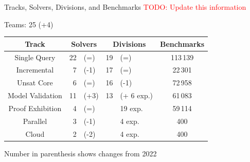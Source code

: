 \documentclass[table]{beamer}
\def\emph#1{\textcolor{MYblue}{#1}}
\begin{document}




\begin{frame}{Tracks, Solvers, Divisions, and Benchmarks}
  \textcolor{red}{TODO: Update this information}

  Teams: 25 (+4) %
  \bigskip

  \begin{tabular}{c|r@{}l|r@{}l|c}
    Track & \multicolumn{2}{c|}{Solvers} & \multicolumn{2}{c|}{Divisions}  & Benchmarks \\
    \hline
    Single Query  &  22&(=)  & 19&(=)  & 113\,139 \\
    Incremental &  7&(-1)   & 17&(=)  & 22\,301   \\
    Unsat Core  &  6&(=)   & 16&(-1)  & 72\,958  \\
    Model Validation  &  11&(+3)    &  13& (+ 6 exp.)  & 61\,083  \\
    Proof Exhibition  &  4&(=)    &  & 19 exp.  & 59\,114  \\
    \hline
    Parallel &   3&(-1)      &   &4 exp.  & 400 \\
    Cloud & 2&(-2)      &  &4 exp.  & 400 \\

  \end{tabular}
  \bigskip

  Number in parenthesis shows changes from 2022
\end{frame}
\end{document}
